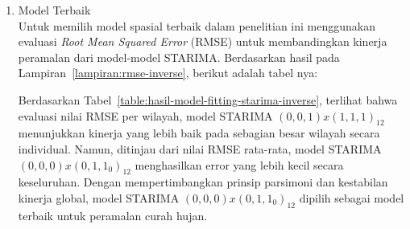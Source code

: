 \begin{enumerate}[label=\Alph*.]
    Parameter yang diestimasi dari model yang telah diidentifikasi yaitu STARIMA $(0,0,1)(1,1,1)_{12}$ dan STARIMA $(0,0,0)(0,1,1_{0})_{12}$ menggunakan metode Maximum Likelihood, disajikan dalam Tabel~\ref{table:estimasi-paramater-starima-inverse}, bersama dengan standar error, nilai $t$, dan nilai $p$ masing-masing:
    
    Berdasarkan Tabel~\ref{table:estimasi-paramater-starima-inverse} hasil estimasi parameter dari kedua model dari lag spasial 0 dan lag spasial 1 yang di estimasi menggunakan metode Maximum Likelihood.
    Masing-masing parameter dilaporkan bersama standar error, nilai $t$, dan nilai $p$ untuk menilai signifikansi statistik.
    Secara umum berdasarkan signifikansi, model STARIMA dengan spatial lag 0 merupakan model terbaik. Model STARIMA $(0,0,1) x (1,1,1)_{12}$ dengan spatial lag 0 memiliki seluruh parameter yang signifikan dan mampu menangkap dinamika temporal jangka pendek serta pola musiman tahunan secara komprehensif.
    Sebaliknya, model STARIMA $(0,0,0) x (0,1,1_{0})_{12}$ dengan spatial lag 1 hanya menangkap komponen musiman dan menunjukkan struktur yang terlalu sederhana.
    Oleh karena itu, model dengan spatial lag 0 dinilai lebih layak digunakan sebagai model akhir dalam penelitian ini.

    \item Model Terbaik \\
    Untuk memilih model spasial terbaik dalam penelitian ini menggunakan evaluasi \textit{Root Mean Squared Error} (RMSE) untuk membandingkan kinerja peramalan dari model-model STARIMA. 
    Berdasarkan hasil pada Lampiran~\ref{lampiran:rmse-inverse},  berikut adalah tabel nya:
    
    Berdasarkan Tabel~\ref{table:hasil-model-fitting-starima-inverse}, terlihat bahwa evaluasi nilai RMSE per wilayah, model STARIMA $(0,0,1) x (1,1,1)_{12}$ menunjukkan kinerja yang lebih baik pada sebagian besar wilayah secara individual.
    Namun, ditinjau dari nilai RMSE rata-rata, model STARIMA $(0,0,0) x (0,1,1_{0})_{12}$ menghasilkan error yang lebih kecil secara keseluruhan.
    Dengan mempertimbangkan prinsip parsimoni dan kestabilan kinerja global, model STARIMA $(0,0,0) x (0,1,1_{0})_{12}$ dipilih sebagai model terbaik untuk peramalan curah hujan.


\end{enumerate}
